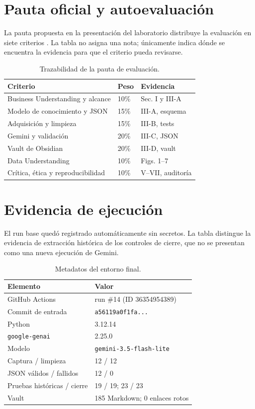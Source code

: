 \documentclass[conference]{IEEEtran}
\begin{document}
\section{Pauta oficial y autoevaluación}
La pauta propuesta en la presentación del laboratorio distribuye la evaluación en siete criterios \cite{bekios2026}. La tabla no asigna una nota; únicamente indica dónde se encuentra la evidencia para que el criterio pueda revisarse.

\begin{table}[!h]
\centering
\caption{Trazabilidad de la pauta de evaluación.}
\label{tab:rubrica}
\scriptsize
\begin{tabular}{@{}p{}p{}p{}@{}}
\toprule
\textbf{Criterio} & \textbf{Peso} & \textbf{Evidencia} \\
\midrule
Business Understanding y alcance & 10\% & Sec. I y III-A \\
Modelo de conocimiento y JSON & 15\% & III-A, esquema \\
Adquisición y limpieza & 15\% & III-B, tests \\
Gemini y validación & 20\% & III-C, JSON \\
Vault de Obsidian & 20\% & III-D, vault \\
Data Understanding & 10\% & Figs. 1--7 \\
Crítica, ética y reproducibilidad & 10\% & V--VII, auditoría \\
\bottomrule
\end{tabular}
\end{table}

\section{Evidencia de ejecución}
El run base quedó registrado automáticamente sin secretos. La tabla distingue la evidencia de extracción histórica de los controles de cierre, que no se presentan como una nueva ejecución de Gemini.

\begin{table}[!h]
\centering
\caption{Metadatos del entorno final.}
\scriptsize
\begin{tabular}{@{}ll@{}}
\toprule
\textbf{Elemento} & \textbf{Valor} \\
\midrule
GitHub Actions & run \#14 (ID 36354954389) \\
Commit de entrada & \texttt{a56119a0f1fa...} \\
Python & 3.12.14 \\
\texttt{google-genai} & 2.25.0 \\
Modelo & \texttt{gemini-3.5-flash-lite} \\
Captura / limpieza & 12 / 12 \\
JSON válidos / fallidos & 12 / 0 \\
Pruebas históricas / cierre & 19 / 19; 23 / 23 \\
Vault & 185 Markdown; 0 enlaces rotos \\
\bottomrule
\end{tabular}
\end{table}
\end{document}
